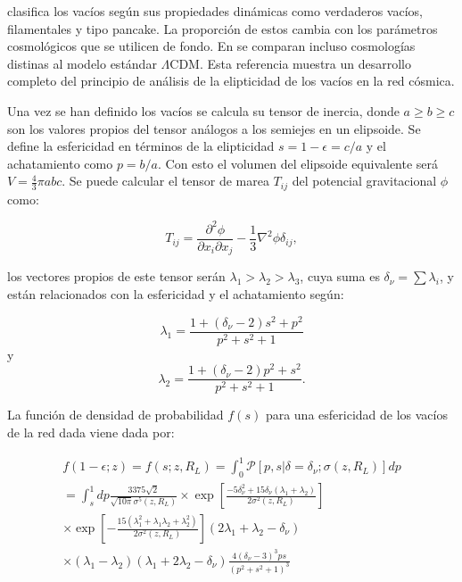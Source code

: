 \documentclass[preprint]{aastex62}
\begin{document}
  \citet{https://arxiv.org/pdf/0906.4101.pdf} clasifica los vacíos
  según sus propiedades dinámicas como verdaderos vacíos, filamentales y tipo pancake.
  La proporción de estos cambia con los parámetros cosmológicos que se utilicen de fondo.
  En \citet{https://arxiv.org/pdf/1205.4238.pdf} se comparan incluso cosmologías distinas al modelo
  estándar $\Lambda$CDM. Esta referencia muestra un desarrollo completo del principio de análisis de
  la elipticidad de los vacíos en la red cósmica.

  Una vez se han definido los vacíos se calcula su tensor de inercia, donde $a \geq b \geq c$ son los
  valores propios del tensor análogos a los semiejes en un elipsoide. Se define la esfericidad en
  términos de la elipticidad $s = 1 - \epsilon = c / a$ y el achatamiento como $ p = b / a$. Con esto
  el volumen del elipsoide equivalente será $V = \frac{4}{3}\pi abc$. Se puede calcular el tensor de
  marea $T_{ij}$ del potencial gravitacional $\phi$ como:

  \begin{equation}
    T_{ij} = \frac{\partial^2 \phi}{\partial x_i \partial x_j} - \frac{1}{3} \nabla^2 \phi \delta_{ij},
  \end{equation}

  los vectores propios de este tensor serán  $\lambda_1 > \lambda_2 > \lambda_3$, cuya suma es
  $\delta_\nu = \sum \lambda_i$, y están relacionados con la esfericidad y el achatamiento según:

  \begin{equation}
    \lambda_1 = \frac{1 + (\delta_\nu -2)s^2 + p^2}{p^2 + s^2 + 1}
 \end{equation}
  y  
  \begin{equation}
    \lambda_2 = \frac{1 + (\delta_\nu -2)p^2 + s^2}{p^2 + s^2 + 1}.
  \end{equation}


  La función de densidad de probabilidad $f(s)$ para una esfericidad de los vacíos de la red dada viene dada por:
  
  \begin{eqnarray}
    f(1-\epsilon;z) = f(s;z, R_L) = \int_0^1 \mathcal{P}\left[ p,s|\delta = \delta_\nu;\sigma(z,R_L)\right] dp \nonumber\\
    = \int_s^1 dp \frac{3375 \sqrt{2}}{ \sqrt{10 \pi} \sigma^5(z,R_L)}
     \times \exp \left[ \frac{-5 \delta_\nu^2 + 15 \delta_\nu ( \lambda_1 + \lambda_2 )}{2 \sigma^2(z,R_L)} \right] \nonumber\\
     \times \exp \left[ - \frac{ 15(\lambda_1^2 + \lambda_1 \lambda_2 + \lambda_2^2)}{ 2\sigma^2(z,R_L)}\right]
    (2\lambda_1 + \lambda_2 - \delta_\nu) \nonumber \\
    \times (\lambda_1 - \lambda_2)( \lambda_1 + 2\lambda_2 - \delta_\nu) \frac{ 4 (\delta_\nu - 3)^3 p s }{ ( p^2 + s^2 + 1)^3}
  \end{eqnarray}
  
\end{document}
